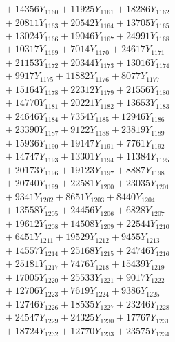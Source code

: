 \documentclass[a4paper,10pt]{article}
\begin{document}
{\begin{align}
&\;  + 14356 Y_{1160} + 11925 Y_{1161} + 18286 Y_{1162} \\[0.3ex]
&\;  + 20811 Y_{1163} + 20542 Y_{1164} + 13705 Y_{1165} \\[0.3ex]
&\;  + 13024 Y_{1166} + 19046 Y_{1167} + 24991 Y_{1168} \\[0.5ex]\allowbreak
&\;  + 10317 Y_{1169} + 7014 Y_{1170} + 24617 Y_{1171} \\[0.3ex]
&\;  + 21153 Y_{1172} + 20344 Y_{1173} + 13016 Y_{1174} \\[0.3ex]
&\;  + 9917 Y_{1175} + 11882 Y_{1176} + 8077 Y_{1177} \\[0.3ex]
&\;  + 15164 Y_{1178} + 22312 Y_{1179} + 21556 Y_{1180} \\[0.3ex]
&\;  + 14770 Y_{1181} + 20221 Y_{1182} + 13653 Y_{1183} \\[0.3ex]
&\;  + 24646 Y_{1184} + 7354 Y_{1185} + 12946 Y_{1186} \\[0.3ex]
&\;  + 23390 Y_{1187} + 9122 Y_{1188} + 23819 Y_{1189} \\[0.3ex]
&\;  + 15936 Y_{1190} + 19147 Y_{1191} + 7761 Y_{1192} \\[0.3ex]
&\;  + 14747 Y_{1193} + 13301 Y_{1194} + 11384 Y_{1195} \\[0.3ex]
&\;  + 20173 Y_{1196} + 19123 Y_{1197} + 8887 Y_{1198} \\[0.5ex]\allowbreak
&\;  + 20740 Y_{1199} + 22581 Y_{1200} + 23035 Y_{1201} \\[0.3ex]
&\;  + 9341 Y_{1202} + 8651 Y_{1203} + 8440 Y_{1204} \\[0.3ex]
&\;  + 13558 Y_{1205} + 24456 Y_{1206} + 6828 Y_{1207} \\[0.3ex]
&\;  + 19612 Y_{1208} + 14508 Y_{1209} + 22544 Y_{1210} \\[0.3ex]
&\;  + 6451 Y_{1211} + 19529 Y_{1212} + 9455 Y_{1213} \\[0.3ex]
&\;  + 14557 Y_{1214} + 25168 Y_{1215} + 24746 Y_{1216} \\[0.3ex]
&\;  + 25181 Y_{1217} + 7476 Y_{1218} + 15439 Y_{1219} \\[0.3ex]
&\;  + 17005 Y_{1220} + 25533 Y_{1221} + 9017 Y_{1222} \\[0.3ex]
&\;  + 12706 Y_{1223} + 7619 Y_{1224} + 9386 Y_{1225} \\[0.3ex]
&\;  + 12746 Y_{1226} + 18535 Y_{1227} + 23246 Y_{1228} \\[0.5ex]\allowbreak
&\;  + 24547 Y_{1229} + 24325 Y_{1230} + 17767 Y_{1231} \\[0.3ex]
&\;  + 18724 Y_{1232} + 12770 Y_{1233} + 23575 Y_{1234} \\[0.3ex]

\end{align}}
\end{document}

